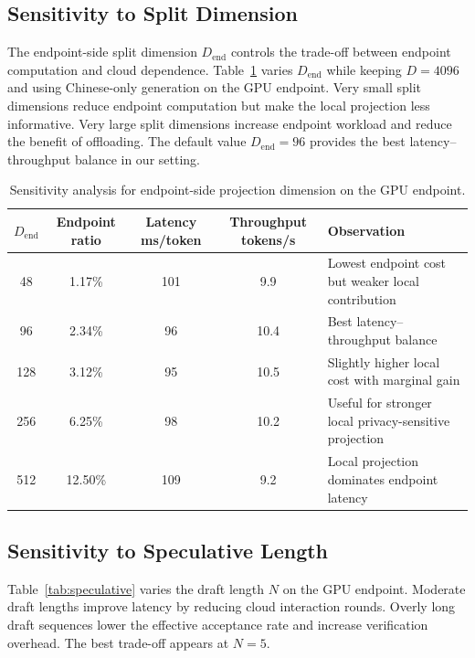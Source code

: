 \documentclass{article}
\newcommand{\End}{\mathrm{end}}
\begin{document}
\subsection{Sensitivity to Split Dimension}

The endpoint-side split dimension $D_{\End}$ controls the trade-off between endpoint computation and cloud dependence. Table~\ref{tab:dimension} varies $D_{\End}$ while keeping $D=4096$ and using Chinese-only generation on the GPU endpoint. Very small split dimensions reduce endpoint computation but make the local projection less informative. Very large split dimensions increase endpoint workload and reduce the benefit of offloading. The default value $D_{\End}=96$ provides the best latency--throughput balance in our setting.

\begin{table}[H]
\centering
\caption{Sensitivity analysis for endpoint-side projection dimension on the GPU endpoint.}
\label{tab:dimension}
\small
\setlength{\tabcolsep}{3pt}
\renewcommand{\arraystretch}{1.10}
\begin{tabularx}{\linewidth}{c c c c >{\raggedright\arraybackslash}X}
\toprule
$D_{\End}$ & Endpoint ratio & Latency ms/token & Throughput tokens/s & Observation \\
\midrule
48 & 1.17\% & 101 & 9.9 & Lowest endpoint cost but weaker local contribution \\
96 & 2.34\% & 96 & 10.4 & Best latency--throughput balance \\
128 & 3.12\% & 95 & 10.5 & Slightly higher local cost with marginal gain \\
256 & 6.25\% & 98 & 10.2 & Useful for stronger local privacy-sensitive projection \\
512 & 12.50\% & 109 & 9.2 & Local projection dominates endpoint latency \\
\bottomrule
\end{tabularx}
\end{table}

\subsection{Sensitivity to Speculative Length}

Table~\ref{tab:speculative} varies the draft length $N$ on the GPU endpoint. Moderate draft lengths improve latency by reducing cloud interaction rounds. Overly long draft sequences lower the effective acceptance rate and increase verification overhead. The best trade-off appears at $N=5$.
\end{document}
